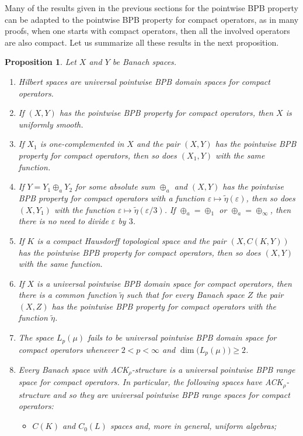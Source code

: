 \documentclass[a4paper,10pt]{amsart}
\theoremstyle{plain}
\newtheorem{proposition}[theorem]{Proposition}
\theoremstyle{definition}
\newcommand{\eps}{\varepsilon}
\renewcommand{\geq}{\geqslant}
\begin{document}
Many of the results given in the previous sections for the pointwise BPB property can be adapted to the pointwise BPB property for compact operators, as in many proofs, when one starts with compact operators, then all the involved operators are also compact. Let us summarize all these results in the next proposition.

\begin{proposition} \label{pointwise BPB property-K:many-results} Let $X$ and $Y$ be Banach spaces. 	
\begin{enumerate}
\item[(a)] Hilbert spaces are universal pointwise BPB domain spaces for compact operators.
\item[(b)] If $(X, Y)$ has the pointwise BPB property for compact operators, then $X$ is uniformly smooth.
\item[(c)] If $X_1$ is one-complemented in $X$ and the pair $(X,Y)$ has the pointwise BPB property for compact operators, then so does $(X_1,Y)$ with the same function.
\item[(d)] If $Y=Y_1 \oplus_a Y_2$ for some absolute sum $\oplus_a$ and $(X,Y)$ has the pointwise BPB property for compact operators with a function $\eps\longmapsto \tilde\eta(\eps)$, then so does $(X,Y_1)$ with the function $\eps \longmapsto \tilde\eta(\eps/3)$. If $\oplus_a=\oplus_1$ or $\oplus_a=\oplus_\infty$, then there is no need to divide $\eps$ by $3$.
\item[(e)] If $K$ is a compact Hausdorff topological space and the pair $(X,C(K,Y))$ has the pointwise BPB property for compact operators, then so does $(X,Y)$ with the same function.
\item[(f)] If $X$ is a universal pointwise BPB domain space for compact operators, then there is a common function $\tilde\eta$ such that for every Banach space $Z$ the pair $(X,Z)$ has the pointwise BPB property for compact operators with the function $\tilde\eta$.
\item[(g)] The space $L_p(\mu)$ fails to be universal pointwise BPB domain space for compact operators whenever $2<p<\infty$ and $\dim\bigl(L_p(\mu)\bigr)\geq 2$.
\item[(h)] Every Banach space with ACK$_\rho$-structure is a universal pointwise BPB range space for compact operators. In particular, the following spaces have ACK$_\rho$-structure and so they are universal pointwise BPB range spaces for compact operators:
    \begin{itemize}
\item $C(K)$ and $C_0(L)$ spaces and, more in general, uniform algebras;

\end{itemize}
\end{enumerate}
\end{proposition}
\end{document}
